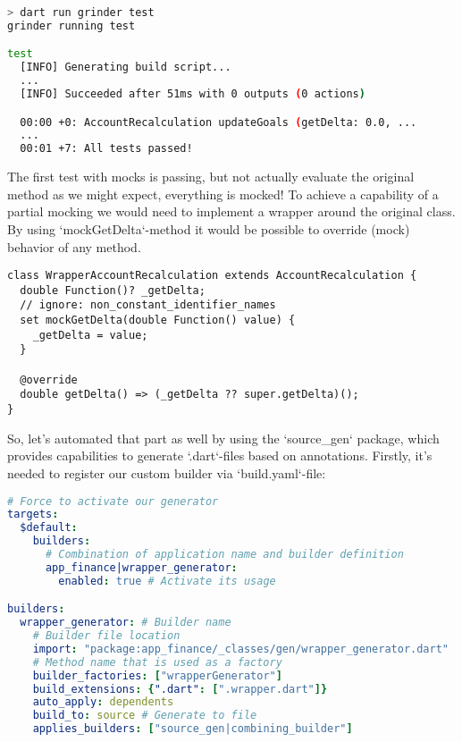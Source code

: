 \begin{lstlisting}[language=bash]
> dart run grinder test
grinder running test

test
  [INFO] Generating build script...
  ...
  [INFO] Succeeded after 51ms with 0 outputs (0 actions)

  00:00 +0: AccountRecalculation updateGoals (getDelta: 0.0, ...
  ...
  00:01 +7: All tests passed!
\end{lstlisting}

\noindent The first test with mocks is passing, but not actually evaluate the original method as we might expect, 
everything is mocked! To achieve a capability of a partial mocking we would need to implement a wrapper around the 
original class. By using `mockGetDelta`-method it would be possible to override (mock) behavior of any method. 

\begin{lstlisting}
class WrapperAccountRecalculation extends AccountRecalculation {
  double Function()? _getDelta;
  // ignore: non_constant_identifier_names
  set mockGetDelta(double Function() value) {
    _getDelta = value;
  }

  @override
  double getDelta() => (_getDelta ?? super.getDelta)();
}
\end{lstlisting}

\noindent So, let's automated that part as well by using the `source\_gen` package, which provides capabilities to 
generate `.dart`-files based on annotations. Firstly, it's needed to register our custom builder via `build.yaml`-file:

\begin{lstlisting}[language=yaml]
# Force to activate our generator
targets:
  $default:
    builders: 
      # Combination of application name and builder definition
      app_finance|wrapper_generator:
        enabled: true # Activate its usage

builders:
  wrapper_generator: # Builder name
    # Builder file location
    import: "package:app_finance/_classes/gen/wrapper_generator.dart"
    # Method name that is used as a factory
    builder_factories: ["wrapperGenerator"]
    build_extensions: {".dart": [".wrapper.dart"]}
    auto_apply: dependents
    build_to: source # Generate to file
    applies_builders: ["source_gen|combining_builder"]
\end{lstlisting}

